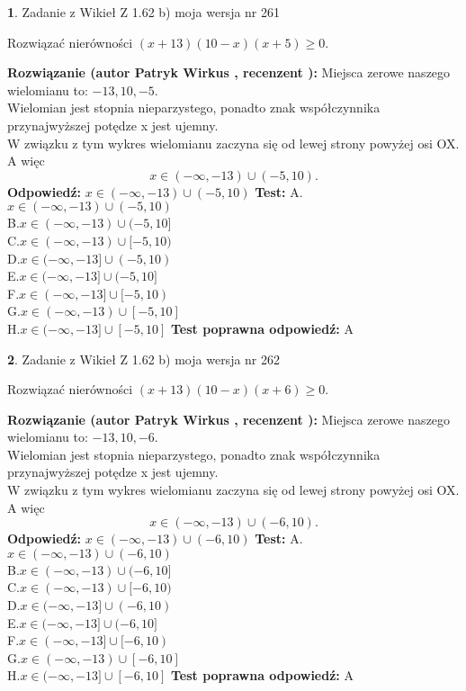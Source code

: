 \documentclass[12pt, a4paper]{article}
\theoremstyle{definition} %
\newtheorem{zad}{}
\newcommand{\zadStart}[1]{\begin{zad}#1\newline}
\newcommand{\zadStop}{\end{zad}}
\newcommand{\rozwStart}[2]{\noindent \textbf{Rozwiązanie (autor #1 , recenzent #2): }\newline}
\newcommand{\rozwStop}{\newline}
\newcommand{\odpStart}{\noindent \textbf{Odpowiedź:}\newline}
\newcommand{\odpStop}{\newline}
\newcommand{\testStart}{\noindent \textbf{Test:}\newline}
\newcommand{\testStop}{\newline}
\newcommand{\kluczStart}{\noindent \textbf{Test poprawna odpowiedź:}\newline}
\newcommand{\kluczStop}{\newline}
\begin{document}
\zadStart{Zadanie z Wikieł Z 1.62 b) moja wersja nr 261}

Rozwiązać nierówności $(x+13)(10-x)(x+5)\ge0$.
\zadStop
\rozwStart{Patryk Wirkus}{}
Miejsca zerowe naszego wielomianu to: $-13, 10, -5$.\\
Wielomian jest stopnia nieparzystego, ponadto znak współczynnika przy\linebreak najwyższej potędze x jest ujemny.\\ W związku z tym wykres wielomianu zaczyna się od lewej strony powyżej osi OX. A więc $$x \in (-\infty,-13) \cup (-5,10).$$
\rozwStop
\odpStart
$x \in (-\infty,-13) \cup (-5,10)$
\odpStop
\testStart
A.$x \in (-\infty,-13) \cup (-5,10)$\\
B.$x \in (-\infty,-13) \cup (-5,10]$\\
C.$x \in (-\infty,-13) \cup [-5,10)$\\
D.$x \in (-\infty,-13] \cup (-5,10)$\\
E.$x \in (-\infty,-13] \cup (-5,10]$\\
F.$x \in (-\infty,-13] \cup [-5,10)$\\
G.$x \in (-\infty,-13) \cup [-5,10]$\\
H.$x \in (-\infty,-13] \cup [-5,10]$
\testStop
\kluczStart
A
\kluczStop



\zadStart{Zadanie z Wikieł Z 1.62 b) moja wersja nr 262}

Rozwiązać nierówności $(x+13)(10-x)(x+6)\ge0$.
\zadStop
\rozwStart{Patryk Wirkus}{}
Miejsca zerowe naszego wielomianu to: $-13, 10, -6$.\\
Wielomian jest stopnia nieparzystego, ponadto znak współczynnika przy\linebreak najwyższej potędze x jest ujemny.\\ W związku z tym wykres wielomianu zaczyna się od lewej strony powyżej osi OX. A więc $$x \in (-\infty,-13) \cup (-6,10).$$
\rozwStop
\odpStart
$x \in (-\infty,-13) \cup (-6,10)$
\odpStop
\testStart
A.$x \in (-\infty,-13) \cup (-6,10)$\\
B.$x \in (-\infty,-13) \cup (-6,10]$\\
C.$x \in (-\infty,-13) \cup [-6,10)$\\
D.$x \in (-\infty,-13] \cup (-6,10)$\\
E.$x \in (-\infty,-13] \cup (-6,10]$\\
F.$x \in (-\infty,-13] \cup [-6,10)$\\
G.$x \in (-\infty,-13) \cup [-6,10]$\\
H.$x \in (-\infty,-13] \cup [-6,10]$
\testStop
\kluczStart
A
\kluczStop
\end{document}
